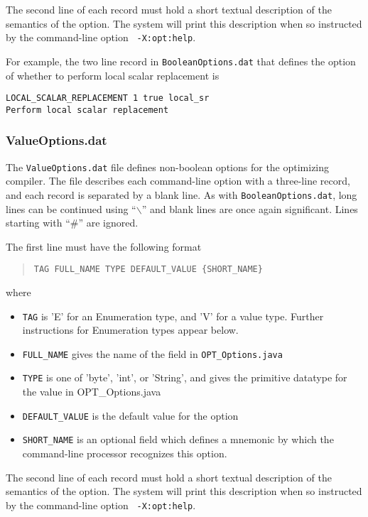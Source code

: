 The second line of each record must hold a short textual description
of the semantics of the option.  The system will print this
description when so instructed by the command-line option {\tt
-X:opt:help}.

For example, the two line record in {\tt BooleanOptions.dat} that
defines the option of whether to perform local scalar replacement is
\begin{verbatim}
LOCAL_SCALAR_REPLACEMENT 1 true local_sr
Perform local scalar replacement
\end{verbatim}

\subsubsection{ValueOptions.dat}

The {\tt ValueOptions.dat} file defines non-boolean options for
the optimizing compiler.  The file describes each command-line option 
with a three-line record, and each record is separated
by a blank line.  As with {\tt BooleanOptions.dat},
long lines can be continued using ``$\backslash$'' and
blank lines are once again significant.
Lines starting with ``\#'' are ignored.

The first line must have the following format
\begin{quote}
\begin{verbatim}
TAG FULL_NAME TYPE DEFAULT_VALUE {SHORT_NAME}
\end{verbatim}
\end{quote}
where
\begin{itemize}
\item {\tt TAG} is 'E' for an Enumeration type, and 'V' for a value type.  Further instructions for Enumeration types appear below.
\item {\tt FULL\_NAME} gives the name of the field in {\tt OPT\_Options.java}
\item {\tt TYPE} is one of 'byte', 'int', or 'String', and gives the primitive datatype for the value in OPT\_Options.java
\item {\tt DEFAULT\_VALUE} is the default value for the option
\item {\tt SHORT\_NAME} is an optional field which defines a mnemonic by which the command-line processor recognizes this option.
\end{itemize}

The second line of each record must hold a short textual description
of the semantics of the option.  The system will print this
description when so instructed by the command-line option {\tt
-X:opt:help}.

